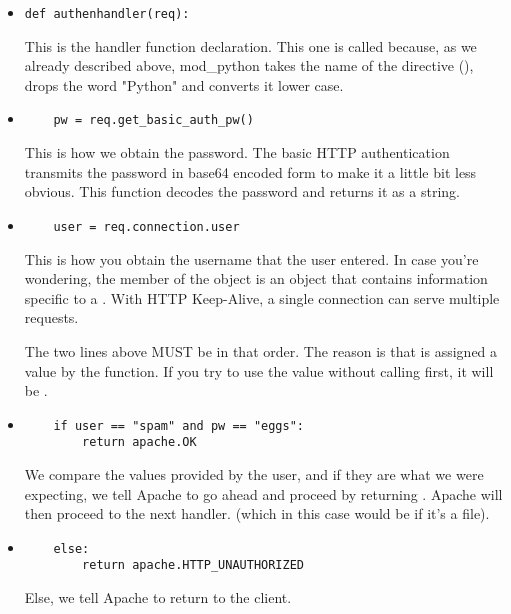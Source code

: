 \begin{itemize}

\item
\begin{verbatim}
def authenhandler(req):
\end{verbatim}

This is the handler function declaration. This one is called
 because, as we already described above, mod_python takes
the name of the directive (), drops the word
"Python" and converts it lower case.

\item
\begin{verbatim}
    pw = req.get_basic_auth_pw()
\end{verbatim}
                  
This is how we obtain the password. The basic HTTP authentication
transmits the password in base64 encoded form to make it a little bit
less obvious. This function decodes the password and returns it as a
string.

\item
\begin{verbatim}
    user = req.connection.user
\end{verbatim}
                  
This is how you obtain the username that the user entered. In case
you're wondering, the  member of the 
object is an object that contains information specific to a
. With HTTP Keep-Alive, a single connection
can serve multiple requests.

 The two lines above MUST be in that order. The reason is that
 is assigned a value by the 
function. If you try to use the  value without calling
 first, it will be .

\item
\begin{verbatim}
    if user == "spam" and pw == "eggs":
        return apache.OK
\end{verbatim}

We compare the values provided by the user, and if they are what we
were expecting, we tell Apache to go ahead and proceed by returning
. Apache will then proceed to the next handler. (which in
this case would be  if it's a  file).

\item
\begin{verbatim}
    else:
        return apache.HTTP_UNAUTHORIZED 
\end{verbatim}

Else, we tell Apache to return  to the client. 

\end{itemize}

